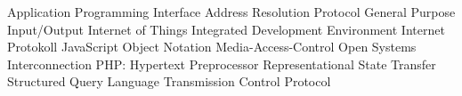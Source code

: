 \begin{acronym}[Bash]
  {Application Programming Interface}
  {Address Resolution Protocol}
  {General Purpose Input/Output}
  {Internet of Things}
  {Integrated Development Environment}
  {Internet Protokoll}
  {JavaScript Object Notation}
  {Media-Access-Control}
  {Open Systems Interconnection}
  {PHP: Hypertext Preprocessor}
  {Representational State Transfer}
  {Structured Query Language}
  {Transmission Control Protocol}
\end{acronym}
